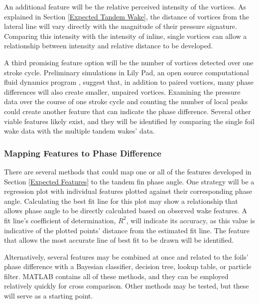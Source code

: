    An additional feature will be the relative perceived intensity of the vortices. As explained in Section \ref{Expected Tandem Wake}, the distance of vortices from the lateral line will vary directly with the magnitude of their pressure signature. Comparing this intensity with the intensity of inline, single vortices can allow a relationship between intensity and relative distance to be developed.
    
    A third promising feature option will be the number of vortices detected over one stroke cycle. Preliminary simulations in Lily Pad, an open source computational fluid dynamics program \citep{Weymouth2015}, suggest that, in addition to paired vortices, many phase differences will also create smaller, unpaired vortices. Examining the pressure data over the course of one stroke cycle and counting the number of local peaks could create another feature that can indicate the phase difference.
    Several other viable features likely exist, and they will be identified by comparing the single foil wake data with the multiple tandem wakes' data.
\subsubsection{Mapping Features to Phase Difference} \label{Mapping Features to Phase Difference}
    
    There are several methods that could map one or all of the features developed in Section \ref{Expected Features} to the tandem fin phase angle. One strategy will be a regression plot with individual features plotted against their corresponding phase angle. Calculating the best fit line for this plot may show a relationship that allows phase angle to be directly calculated based on observed wake features. A fit line's coefficient of determination, \(R^2\), will indicate its accuracy, as this value is indicative of the plotted points' distance from the estimated fit line. The feature that allows the most accurate line of best fit to be drawn will be identified.
    
    Alternatively, several features may be combined at once and related to the foils' phase difference with a Bayesian classifier, decision tree, lookup table, or particle filter. MATLAB contains all of these methods, and they can be employed relatively quickly for cross comparison. Other methods may be tested, but these will serve as a starting point.